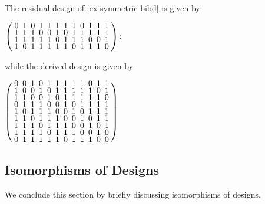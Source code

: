 \documentclass[../../../main]{subfiles}
\begin{document}
\begin{ex}
  The residual design of \ref{ex-symmetric-bibd} is given by
  \begin{defenum}
  \item $
    \left(
      \arraycolsep=2.5pt\def\arraystretch{0.625}
      \begin{array}{cccccccccccc}
        0&1&0&1&1&1&1&1&0&1&1&1\\
        1&1&1&0&0&1&0&1&1&1&1&1\\
        1&1&1&1&1&0&1&1&1&0&0&1\\
        1&0&1&1&1&1&1&0&1&1&1&0\\
      \end{array}
    \right);
    $
  \end{defenum}
  while the derived design is given by
  \begin{defenum}[resume]
  \item $
    \left(
      \arraycolsep=2.5pt\def\arraystretch{0.625}
      \begin{array}{cccccccccccc}
        0&0&1&0&1&1&1&1&1&0&1&1\\
        1&0&0&1&0&1&1&1&1&1&0&1\\
        1&1&0&0&1&0&1&1&1&1&1&0\\
        0&1&1&1&0&0&1&0&1&1&1&1\\
        1&0&1&1&1&0&0&1&0&1&1&1\\
        1&1&0&1&1&1&0&0&1&0&1&1\\
        1&1&1&0&1&1&1&0&0&1&0&1\\
        1&1&1&1&0&1&1&1&0&0&1&0\\
        0&1&1&1&1&1&0&1&1&1&0&0\\
      \end{array}
    \right)
    $
  \end{defenum}
\end{ex}

\dinkus


\subsection{Isomorphisms of Designs}

We conclude this section by briefly discussing isomorphisms of designs. 
\end{document}
